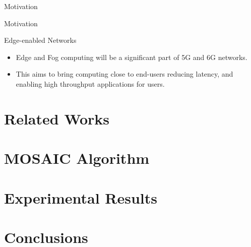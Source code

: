 \documentclass[10pt]{beamer}
\begin{document}
\begin{frame}{Motivation}
    \begin{block}{}
    \end{block}
\end{frame}

\begin{frame}{Motivation}
    \begin{block}{Edge-enabled Networks}
    \begin{itemize}
        \item Edge and Fog computing will be a significant part of 5G and 6G networks.
        \item This aims to bring computing close to end-users reducing latency, and enabling high throughput applications for users.
    \end{itemize}
    \end{block}
\end{frame}

\section{Related Works}

\section{MOSAIC Algorithm}

\section{Experimental Results}

\section{Conclusions}
\end{document}
